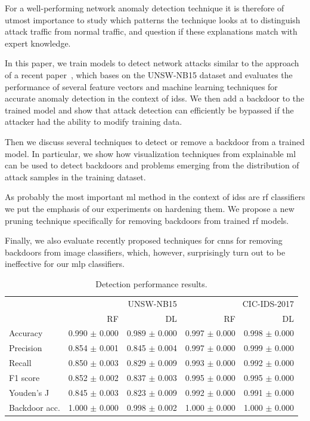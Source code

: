 \documentclass[10pt,sigconf,letterpaper,dvipsnames]{acmart}
\begin{document}
For a well-performing network anomaly detection technique it is therefore of utmost importance to study which patterns the technique looks at to distinguish attack traffic from normal traffic, and question if these explanations match with expert knowledge.

In this paper, we train models to detect network attacks similar to the approach of a recent paper~\cite{meghdouri_analysis_2018}, which bases on the UNSW-NB15 dataset \cite{moustafa_unsw-nb15:_2015} and evaluates the performance of several feature vectors and machine learning techniques for accurate anomaly detection in the context of \glspl{ids}.
We then add a backdoor to the trained model and show that attack detection can efficiently be bypassed if the attacker had the ability to modify training data.

Then we discuss several techniques to detect or remove a backdoor from a trained model. In particular, we show how visualization techniques from explainable \gls{ml} can be used to detect backdoors and problems emerging from the distribution of attack samples in the training dataset.

As probably the most important \gls{ml} method in the context of \glspl{ids} are \gls{rf} classifiers we put the emphasis of our experiments on hardening them. We propose a new pruning technique specifically for removing backdoors from trained \gls{rf} models.

Finally, we also evaluate recently proposed techniques for \glspl{cnn} for removing backdoors from image classifiers, which, however, surprisingly turn out to be ineffective for our \gls{mlp} classifiers. 

\begin{table}[h]
\caption{Detection performance results.} \label{tab:performance_results}
\begin{tabular}{l r r r r} \toprule
& \multicolumn{2}{r}{UNSW-NB15} & \multicolumn{2}{r}{CIC-IDS-2017} \\
& RF & DL & RF & DL \\ \midrule
Accuracy	& 0.990 $\pm$ 0.000	& 0.989 $\pm$ 0.000	& 0.997 $\pm$ 0.000	& 0.998 $\pm$ 0.000	\\
Precision	& 0.854 $\pm$ 0.001	& 0.845 $\pm$ 0.004	& 0.997 $\pm$ 0.000	& 0.999 $\pm$ 0.000	\\
Recall	& 0.850 $\pm$ 0.003	& 0.829 $\pm$ 0.009	& 0.993 $\pm$ 0.000	& 0.992 $\pm$ 0.000	\\
F1 score	& 0.852 $\pm$ 0.002	& 0.837 $\pm$ 0.003	& 0.995 $\pm$ 0.000	& 0.995 $\pm$ 0.000	\\
Youden's J	& 0.845 $\pm$ 0.003	& 0.823 $\pm$ 0.009	& 0.992 $\pm$ 0.000	& 0.991 $\pm$ 0.000	\\
Backdoor acc.	& 1.000 $\pm$ 0.000	& 0.998 $\pm$ 0.002	& 1.000 $\pm$ 0.000	& 1.000 $\pm$ 0.000	\\


\bottomrule
\end{tabular}
\end{table}
\end{document}
